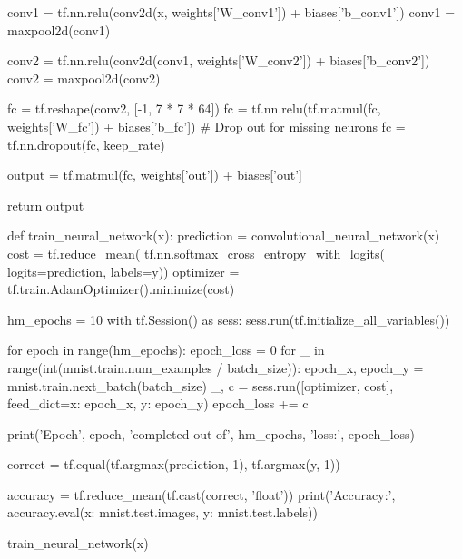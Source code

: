 \documentclass[11pt]{article}
\begin{document}
\begin{python}
    conv1 = tf.nn.relu(conv2d(x, weights['W_conv1'])
                       + biases['b_conv1'])
    conv1 = maxpool2d(conv1)

    conv2 = tf.nn.relu(conv2d(conv1, weights['W_conv2'])
                       + biases['b_conv2'])
    conv2 = maxpool2d(conv2)

    fc = tf.reshape(conv2, [-1, 7 * 7 * 64])
    fc = tf.nn.relu(tf.matmul(fc, weights['W_fc']) + biases['b_fc'])
    # Drop out for missing neurons
    fc = tf.nn.dropout(fc, keep_rate)

    output = tf.matmul(fc, weights['out']) + biases['out']

    return output


def train_neural_network(x):
    prediction = convolutional_neural_network(x)
    cost = tf.reduce_mean(
        tf.nn.softmax_cross_entropy_with_logits(
            logits=prediction, labels=y))
    optimizer = tf.train.AdamOptimizer().minimize(cost)

    hm_epochs = 10
    with tf.Session() as sess:
        sess.run(tf.initialize_all_variables())

        for epoch in range(hm_epochs):
            epoch_loss = 0
            for _ in range(int(mnist.train.num_examples / batch_size)):
                epoch_x, epoch_y = mnist.train.next_batch(batch_size)
                _, c = sess.run([optimizer, cost],
                                feed_dict={x: epoch_x, y: epoch_y})
                epoch_loss += c

            print('Epoch', epoch, 'completed out of', hm_epochs,
                  'loss:', epoch_loss)

        correct = tf.equal(tf.argmax(prediction, 1), tf.argmax(y, 1))

        accuracy = tf.reduce_mean(tf.cast(correct, 'float'))
        print('Accuracy:', accuracy.eval({x: mnist.test.images,
                                          y: mnist.test.labels}))


train_neural_network(x)
\end{python}{}
\clearpage
\end{document}
